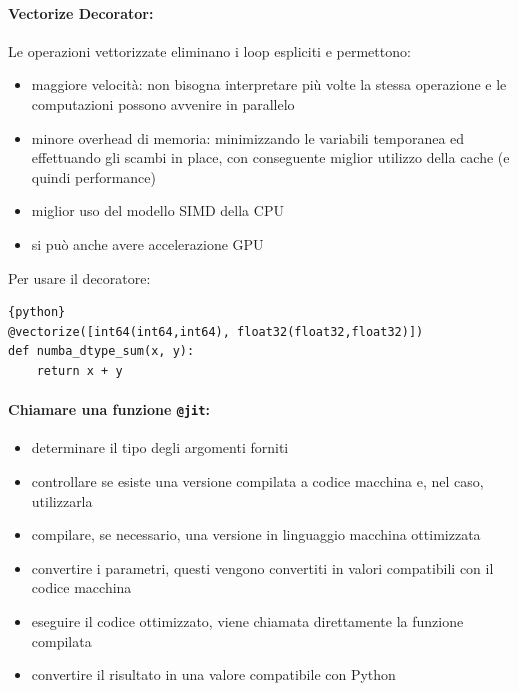 \paragraph{Vectorize Decorator:} Le operazioni vettorizzate eliminano i loop espliciti e permettono: 
\begin{itemize}
	\item maggiore velocità: non bisogna interpretare più volte la stessa operazione e le computazioni possono avvenire in parallelo
	
	\item minore overhead di memoria: minimizzando le variabili temporanea ed effettuando gli scambi in place, con conseguente miglior utilizzo della cache (e quindi performance)
	
	\item miglior uso del modello SIMD della CPU
	
	\item si può anche avere accelerazione GPU
\end{itemize}
Per usare il decoratore:
\begin{lstlisting}{python}
@vectorize([int64(int64,int64), float32(float32,float32)])
def numba_dtype_sum(x, y):
    return x + y
\end{lstlisting}


\paragraph{Chiamare una funzione \texttt{@jit}:} 
\begin{itemize}
	\item determinare il tipo degli argomenti forniti
	
	\item controllare se esiste una versione compilata a codice macchina e, nel caso, utilizzarla
	
	\item compilare, se necessario, una versione in linguaggio macchina ottimizzata
	
	\item convertire i parametri, questi vengono convertiti in valori compatibili con il codice macchina
	
	\item eseguire il codice ottimizzato, viene chiamata direttamente la funzione compilata
	
	\item convertire il risultato in una valore compatibile con Python
\end{itemize}

